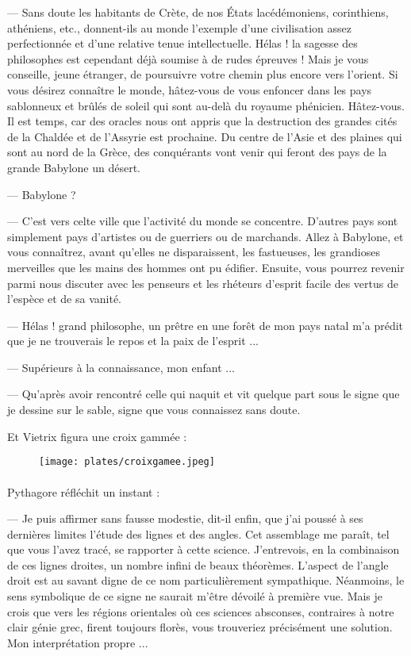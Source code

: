 \documentclass[a4paper, 11pt, oneside, polutonikogreek, french]{article}
\begin{document}
--- Sans doute les habitants de Crète, de nos États lacédémoniens, corinthiens, athéniens, etc., donnent-ils au monde l'exemple d'une civilisation assez perfectionnée et d'une relative tenue intellectuelle. Hélas ! la sagesse des philosophes est cependant déjà soumise à de rudes épreuves ! Mais je vous conseille, jeune étranger, de poursuivre votre chemin plus encore vers l'orient. Si vous désirez connaître le monde, hâtez-vous de vous enfoncer dans les pays sablonneux et brûlés de soleil qui sont au-delà du royaume phénicien. Hâtez-vous. Il est temps, car des oracles nous ont appris que la destruction des grandes cités de la Chaldée et de l'Assyrie est prochaine. Du centre de l'Asie et des plaines qui sont au nord de la Grèce, des conquérants vont venir qui feront des pays de la grande Babylone un désert.

--- Babylone ?

--- C'est vers celte ville que l'activité du monde se concentre. D'autres pays sont simplement pays d'artistes ou de guerriers ou de marchands. Allez à Babylone, et vous connaîtrez, avant qu'elles ne disparaissent, les fastueuses, les grandioses merveilles que les mains des hommes ont pu édifier. Ensuite, vous pourrez revenir parmi nous discuter avec les penseurs et les rhéteurs d'esprit facile des vertus de l'espèce et de sa vanité.

\bigskip
\centerline{\EightStarTaper}
\centerline{\EightStarTaper\EightStarTaper}
\bigskip

--- Hélas ! grand philosophe, un prêtre en une forêt de mon pays natal m'a prédit que je ne trouverais le repos et la paix de l'esprit ...

--- Supérieurs à la connaissance, mon enfant ...

--- Qu'après avoir rencontré celle qui naquit et vit quelque part sous le signe que je dessine sur le sable, signe que vous connaissez sans doute.

Et Vietrix figura une croix gammée :

\begin{figure}[H]
\centering
\texttt{[image: plates/croixgamee.jpeg]}
\end{figure}
\paragraph{}
Pythagore réfléchit un instant :

--- Je puis affirmer sans fausse modestie, dit-il enfin, que j'ai poussé à ses dernières limites l'étude des lignes et des angles. Cet assemblage me paraît, tel que vous l'avez tracé, se rapporter à cette science. J'entrevois, en la combinaison de ces lignes droites, un nombre infini de beaux théorèmes. L'aspect de l'angle droit est au savant digne de ce nom particulièrement sympathique. Néanmoins, le sens symbolique de ce signe ne saurait m'être dévoilé à première vue. Mais je crois que vers les régions orientales où ces sciences absconses, contraires à notre clair génie grec, firent toujours florès, vous trouveriez précisément une solution. Mon interprétation propre ...
\end{document}

